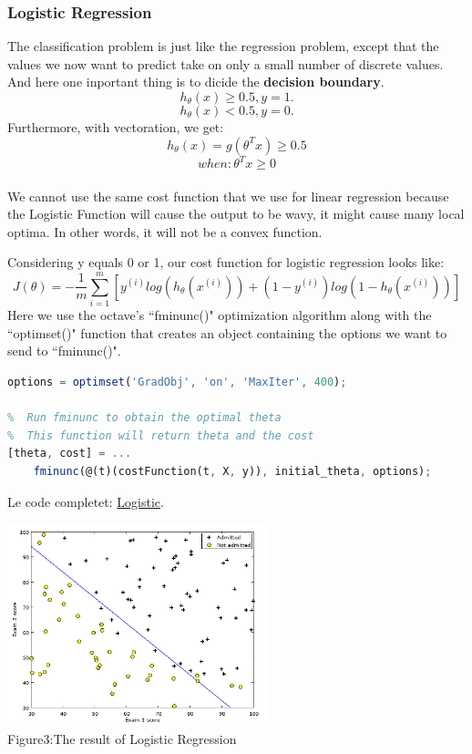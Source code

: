\documentclass[a4paper]{article}
\begin{document}
{\subsubsection{\textbf{Logistic Regression}}
The classification problem is just like the regression problem, except that the values we now want to predict take on only a small number of discrete values. And here one inportant thing is to dicide the \textbf{decision boundary}.
$$h_\theta(x)\ge0.5,y=1.$$
	$$h_\theta(x)<0.5,y=0.$$
Furthermore, with vectoration, we get:$$h_\theta(x)=g(\theta^Tx)\ge0.5$$$$when:\theta^Tx\ge0$$\\We cannot use the same cost function that we use for linear regression because the Logistic Function will cause the output to be wavy, it might cause many local optima. In other words, it will not be a convex function.

Considering y equals 0 or 1, our cost function for logistic regression looks like:$$J(\theta)=-\frac{1}{m}\sum_{i=1}^m[y^{(i)}log(h_\theta(x^{(i)}))+(1-y^{(i)})log(1-h_\theta(x^{(i)}))]$$
Here we use the octave's  ``fminunc()" optimization algorithm along with the ``optimset()" function that creates an object containing the options we want to send to ``fminunc()".
\begin{lstlisting}[language=Octave]
%  Set options for fminunc:
options = optimset('GradObj', 'on', 'MaxIter', 400);

%  Run fminunc to obtain the optimal theta
%  This function will return theta and the cost 
[theta, cost] = ...
	fminunc(@(t)(costFunction(t, X, y)), initial_theta, options);

\end{lstlisting}
Le code completet: \href{https://github.com/GuangYueCHEN/ENSIIE/tree/master/Plus/MachineLearning/machine-learning-ex2}{Logistic}.
\newpage
\begin{center}
\includegraphics[width=3in]{log.png}\\
Figure3:The result of Logistic Regression
\end{center}
}
\end{document}
